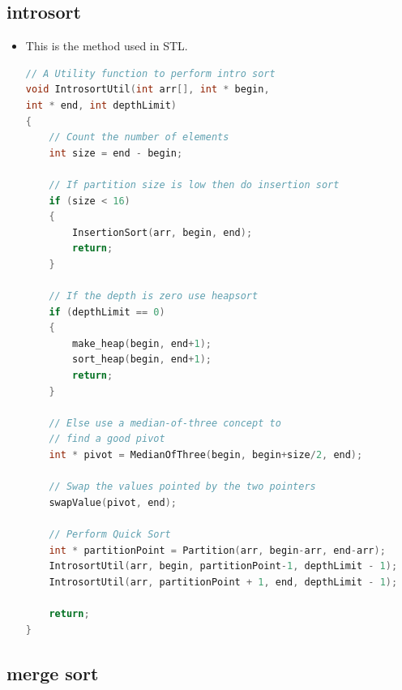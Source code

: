 \documentclass[a4paper,11pt,twoside]{book}
\begin{document}
\subsection{introsort}
\begin{itemize}
	\item This is the method used in STL.
	
\begin{lstlisting}[frame=single, language=c++]
// A Utility function to perform intro sort
void IntrosortUtil(int arr[], int * begin,
int * end, int depthLimit)
{
	// Count the number of elements
	int size = end - begin;
	
	// If partition size is low then do insertion sort
	if (size < 16)
	{
		InsertionSort(arr, begin, end);
		return;
	}
	
	// If the depth is zero use heapsort
	if (depthLimit == 0)
	{
		make_heap(begin, end+1);
		sort_heap(begin, end+1);
		return;
	}
	
	// Else use a median-of-three concept to
	// find a good pivot
	int * pivot = MedianOfThree(begin, begin+size/2, end);
	
	// Swap the values pointed by the two pointers
	swapValue(pivot, end);
	
	// Perform Quick Sort
	int * partitionPoint = Partition(arr, begin-arr, end-arr);
	IntrosortUtil(arr, begin, partitionPoint-1, depthLimit - 1);
	IntrosortUtil(arr, partitionPoint + 1, end, depthLimit - 1);
	
	return;
}	
\end{lstlisting}

\end{itemize}

\subsection{merge sort}
\end{document}
